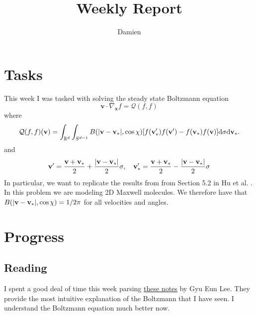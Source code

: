 \documentclass{article}
\title{Weekly Report}
\author{Damien}
\def\t{\text}
\def\b{\textbf}
\begin{document}
\maketitle
\section{Tasks}
This week I was tasked with solving the steady state Boltzmann equation
\[
    \b{v} \cdot \nabla_{\b{x}}f = \mathcal{Q}(f,f)
\]
where
\[
    \mathcal{Q}(f,f)(\b v) = \int_{\mathbb{R}^d} \int_{S^{d-1}} B(|\b v - \b v_*|,\cos \chi)[f(\b v_*') f(\b v') - f(\b v_*) f(\b v)] \t d \sigma \t d \b v_*.
\]
and
\[
    \b v' = \frac{\b v + \b v_*}{2} + \frac{|\b v - \b v_*|}{2} \mathbf{\sigma}, \quad
    \b v_*' = \frac{\b v + \b v_*}{2} - \frac{|\b v - \b v_*|}{2} \mathbf{\sigma}
\]
In particular, we want to replicate the results from from Section 5.2 in Hu et al. \cite{hu2021adaptive}. In this problem we are modeling 2D Maxwell molecules. We therefore have that $B(|\b v - \b v_*|,\cos \chi) = 1/2 \pi$ for all velocities and angles. 
\section{Progress}
\subsection{Reading}
I spent a good deal of time this week parsing \href{https://gyu-eun-lee.github.io/academic/gso_boltzmann.pdf}{these notes} by Gyu Eun Lee. They provide the most intuitive explanation of the Boltzmann that I have seen. I understand the Boltzmann equation much better now.
\end{document}
